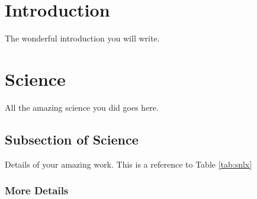 \documentclass[12pt]{article}
\begin{document}
 
   
         
       
 \doublespacing
\setcounter{page}{1}
\section{Introduction}
\label{introlabel}
The wonderful introduction you will write.
\newpage
\section{Science}
\label{chapterlabel}
All the amazing science you did goes here.

\subsection{Subsection of Science}
Details of your amazing work. This is a reference to Table \ref{tab:snlx}
\subsubsection{More Details}
\end{document}
